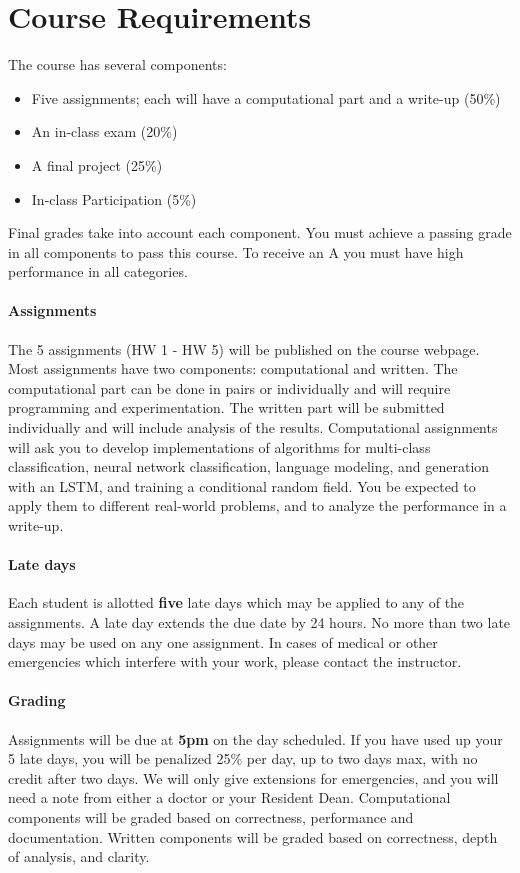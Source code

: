 \documentclass[11pt]{article}
\begin{document}
\vspace {0.25cm}
\section{Course Requirements}

The course has several components:

\begin{itemize}
\item Five assignments; each will have a computational part and a write-up (50\%)
\item An in-class exam (20\%)
\item A final project  (25\%)
\item In-class Participation (5\%)
\end{itemize}


\noindent Final grades take into account each component. You must
achieve a passing grade in all components to pass this course. To
receive an A you must have high performance in all categories.

\paragraph{Assignments}

The 5 assignments (HW 1 - HW 5) will be published on the course
webpage. Most assignments have two components: computational and
written. The computational part can be done in pairs or individually
and will require programming and experimentation. The written part
will be submitted individually and will include analysis of the
results.  Computational assignments will ask you to develop
implementations of algorithms for multi-class classification, neural
network classification, language modeling, and generation with an
LSTM, and training a conditional random field. You be expected to
apply them to different real-world problems, and to analyze the
performance in a write-up.

\paragraph{Late days} Each student is allotted \textbf{five} late days
which may be applied to any of the assignments.  A late day extends the
due date by 24 hours. No more than two late days may be used on any
one assignment. In cases of medical or other emergencies which
interfere with your work, please contact the
instructor.

\paragraph{Grading} Assignments will be due at \textbf{5pm} on the day
scheduled. If you have used up your 5 late days, you will be penalized
25\% per day, up to two days max, with no credit after two days. We
will only give extensions for emergencies, and you will need a note
from either a doctor or your Resident Dean. Computational components
will be graded based on correctness, performance and documentation.
Written components will be graded based on correctness, depth of
analysis, and clarity.
\end{document}

